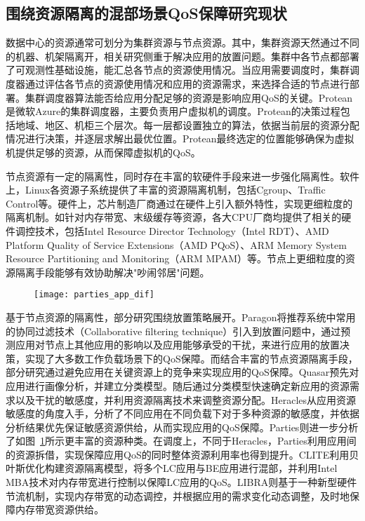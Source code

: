 \subsection{围绕资源隔离的混部场景QoS保障研究现状}


数据中心的资源通常可划分为集群资源与节点资源。其中，集群资源天然通过不同的机器、机架隔离开，相关研究侧重于解决应用的放置问题。集群中各节点都部署了可观测性基础设施，能汇总各节点的资源使用情况。当应用需要调度时，集群调度器通过评估各节点的资源使用情况和应用的资源需求，来选择合适的节点进行部署。集群调度器算法能否给应用分配足够的资源是影响应用QoS的关键。Protean\citep{hadary2020protean}是微软Azure的集群调度器，主要负责用户虚拟机的调度。Protean的决策过程包括地域、地区、机柜三个层次。每一层都设置独立的算法，依据当前层的资源分配情况进行决策，并逐层求解出最优位置。Protean最终选定的位置能够确保为虚拟机提供足够的资源，从而保障虚拟机的QoS。

节点资源有一定的隔离性，同时存在丰富的软硬件手段来进一步强化隔离性。软件上，Linux各资源子系统提供了丰富的资源隔离机制，包括Cgroup、Traffic Control等。硬件上，芯片制造厂商通过在硬件上引入额外特性，实现更细粒度的隔离机制。如针对内存带宽、末级缓存等资源，各大CPU厂商均提供了相关的硬件调控技术，包括Intel Resource Director Technology（Intel RDT）\citep{guide2011intel}、AMD Platform Quality of Service Extensions（AMD PQoS）\citep{amdpqos}、ARM Memory System Resource Partitioning and Monitoring（ARM MPAM）\citep{armmpam}等。节点上更细粒度的资源隔离手段能够有效协助解决"吵闹邻居"问题\citep{xu2018dcat, maricq2018taming, rzadca2020autopilot, kwon2020dc}。

\begin{figure}[!htbp]
    \centering
    \texttt{[image: parties\_app\_dif]}
    \label{fig:parties_app_dif}
\end{figure}

基于节点资源的隔离性，部分研究围绕放置策略展开。Paragon\citep{delimitrou2013paragon}将推荐系统中常用的协同过滤技术（Collaborative filtering technique）引入到放置问题中，通过预测应用对节点上其他应用的影响以及应用能够承受的干扰，来进行应用的放置决策，实现了大多数工作负载场景下的QoS保障。而结合丰富的节点资源隔离手段，部分研究通过避免应用在关键资源上的竞争来实现应用的QoS保障。Quasar\citep{delimitrou2014quasar}预先对应用进行画像分析，并建立分类模型。随后通过分类模型快速确定新应用的资源需求以及干扰的敏感度，并利用资源隔离技术来调整资源分配。Heracles\citep{lo2015heracles}从应用资源敏感度的角度入手，分析了不同应用在不同负载下对于多种资源的敏感度，并依据分析结果优先保证敏感资源供给，从而实现应用的QoS保障。Parties\citep{chen2019parties}则进一步分析了如图~\ref{fig:parties_app_dif}所示更丰富的资源种类。在调度上，不同于Heracles，Parties利用应用间的资源拆借，实现保障应用QoS的同时整体资源利用率也得到提升。CLITE\citep{patel2020clite}利用贝叶斯优化构建资源隔离模型，将多个LC应用与BE应用进行混部，并利用Intel MBA技术对内存带宽进行控制以保障LC应用的QoS。LIBRA\citep{zhang2021libra}则基于一种新型硬件节流机制，实现内存带宽的动态调控，并根据应用的需求变化动态调整，及时地保障内存带宽资源供给。

